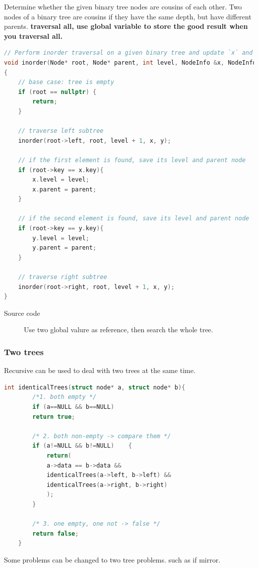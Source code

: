 \documentclass[a4paper,11pt,twoside]{book}
\begin{document}
\par Determine whether the given binary tree nodes are cousins of each other. Two nodes of a binary tree are cousins if they have the same depth, but have different parents.   \textbf{traversal all, use global variable to store the good result when you traversal all. } 
\begin{lstlisting}[frame=single, language=c++]
// Perform inorder traversal on a given binary tree and update `x` and `y`
void inorder(Node* root, Node* parent, int level, NodeInfo &x, NodeInfo &y)
{
	// base case: tree is empty
	if (root == nullptr) {
		return;
	}
	
	// traverse left subtree
	inorder(root->left, root, level + 1, x, y);
	
	// if the first element is found, save its level and parent node
	if (root->key == x.key){
		x.level = level;
		x.parent = parent;
	}
	
	// if the second element is found, save its level and parent node
	if (root->key == y.key){
		y.level = level;
		y.parent = parent;
	}
	
	// traverse right subtree
	inorder(root->right, root, level + 1, x, y);
}	
\end{lstlisting}
\begin{description}
	\item[Source code] Use two global valure as reference, then search the whole tree. 
\end{description}



\subsubsection{Two trees}

	\par Recursive can be used to deal with two trees at the same time. 
\begin{lstlisting}[frame=single, language=c++]
	int identicalTrees(struct node* a, struct node* b){
		/*1. both empty */
		if (a==NULL && b==NULL)
		return true;
		
		/* 2. both non-empty -> compare them */
		if (a!=NULL && b!=NULL)    {
			return(
			a->data == b->data &&
			identicalTrees(a->left, b->left) &&
			identicalTrees(a->right, b->right)
			);
		} 
		
		/* 3. one empty, one not -> false */
		return false;
	} 
\end{lstlisting}	

	\par Some problems can be changed to two tree problems. such as if mirror. 
\end{document}
